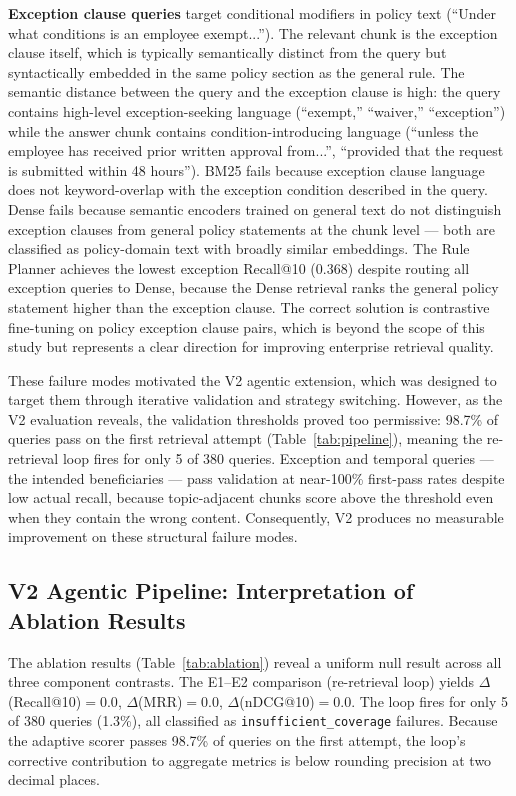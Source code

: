\documentclass[11pt, a4paper]{article}
\begin{document}
\textbf{Exception clause queries} target conditional modifiers in policy text (``Under what conditions is an employee exempt...''). The relevant chunk is the exception clause itself, which is typically semantically distinct from the query but syntactically embedded in the same policy section as the general rule. The semantic distance between the query and the exception clause is high: the query contains high-level exception-seeking language (``exempt,'' ``waiver,'' ``exception'') while the answer chunk contains condition-introducing language (``unless the employee has received prior written approval from...'', ``provided that the request is submitted within 48 hours''). BM25 fails because exception clause language does not keyword-overlap with the exception condition described in the query. Dense fails because semantic encoders trained on general text do not distinguish exception clauses from general policy statements at the chunk level --- both are classified as policy-domain text with broadly similar embeddings. The Rule Planner achieves the lowest exception Recall@10 (0.368) despite routing all exception queries to Dense, because the Dense retrieval ranks the general policy statement higher than the exception clause. The correct solution is contrastive fine-tuning on policy exception clause pairs, which is beyond the scope of this study but represents a clear direction for improving enterprise retrieval quality.

These failure modes motivated the V2 agentic extension, which was designed to target them through iterative validation and strategy switching. However, as the V2 evaluation reveals, the validation thresholds proved too permissive: 98.7\% of queries pass on the first retrieval attempt (Table~\ref{tab:pipeline}), meaning the re-retrieval loop fires for only 5 of 380 queries. Exception and temporal queries --- the intended beneficiaries --- pass validation at near-100\% first-pass rates despite low actual recall, because topic-adjacent chunks score above the threshold even when they contain the wrong content. Consequently, V2 produces no measurable improvement on these structural failure modes.

\subsection{V2 Agentic Pipeline: Interpretation of Ablation Results}

The ablation results (Table~\ref{tab:ablation}) reveal a uniform null result across all three component contrasts. The E1--E2 comparison (re-retrieval loop) yields $\Delta$(Recall@10)$=0.0$, $\Delta$(MRR)$=0.0$, $\Delta$(nDCG@10)$=0.0$. The loop fires for only 5 of 380 queries (1.3\%), all classified as \texttt{insufficient\_coverage} failures. Because the adaptive scorer passes 98.7\% of queries on the first attempt, the loop's corrective contribution to aggregate metrics is below rounding precision at two decimal places.
\end{document}
